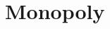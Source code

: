 \documentclass[10pt,aspectratio=169,t,l,fleqn,mathsanserif,sanserif]{beamer}
\begin{document}








\section{Monopoly}
\end{document}
